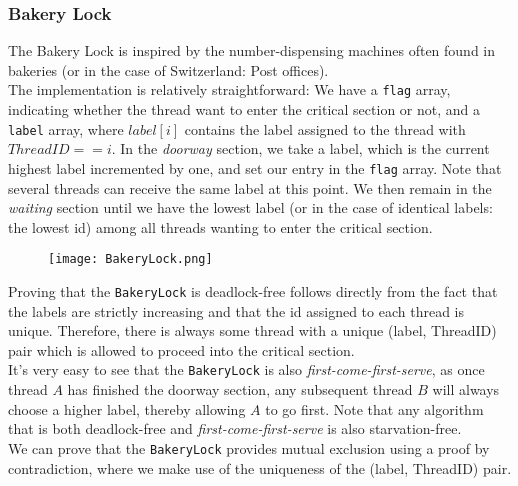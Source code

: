 \documentclass[main]{subfiles}
\begin{document}

\subsubsection{Bakery Lock}
The Bakery Lock is inspired by the number-dispensing machines often found in bakeries (or in the case of Switzerland: Post offices).\\[3mm]
The implementation is relatively straightforward: We have a \texttt{flag} array, indicating whether the thread want to enter the critical section or not, and a \texttt{label} array, where $label[i]$ contains the label assigned to the thread with $ThreadID == i$. In the \textit{doorway} section, we take a label, which is the current highest label incremented by one, and set our entry in the \texttt{flag} array. Note that several threads can receive the same label at this point. We then remain in the \textit{waiting} section until we have the lowest label (or in the case of identical labels: the lowest id) among all threads wanting to enter the critical section. 
\begin{figure}[H]
    \centering
    \texttt{[image: BakeryLock.png]}
\end{figure}
\noindent Proving that the \texttt{BakeryLock} is deadlock-free follows directly from the fact that the labels are strictly increasing and that the id assigned to each thread is unique. Therefore, there is always some thread with a unique (label, ThreadID) pair which is allowed to proceed into the critical section.\\[3mm]
It's very easy to see that the \texttt{BakeryLock} is also \textit{first-come-first-serve}, as once thread $A$ has finished the doorway section, any subsequent thread $B$ will always choose a higher label, thereby allowing $A$ to go first. Note that any algorithm that is both deadlock-free and \textit{first-come-first-serve} is also starvation-free.\\[3mm]
We can prove that the \texttt{BakeryLock} provides mutual exclusion using a proof by contradiction, where we make use of the uniqueness of the (label, ThreadID) pair.
 
\end{document}
